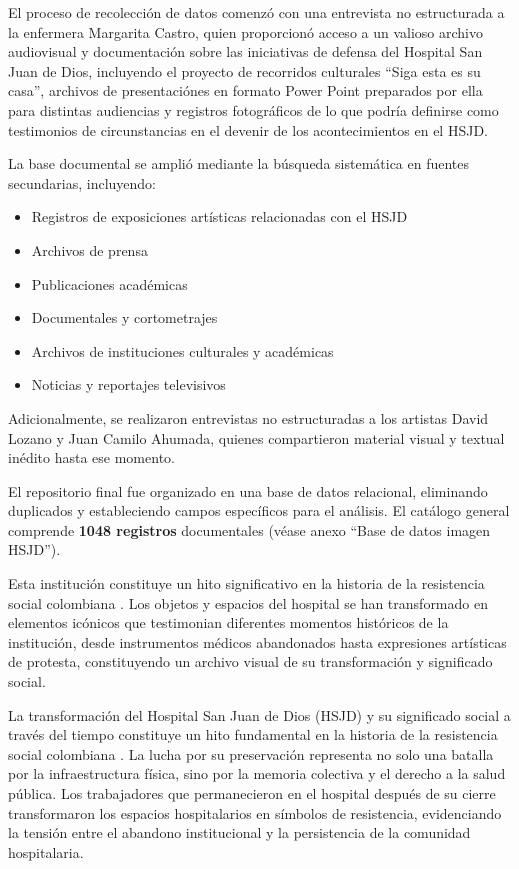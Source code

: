 El proceso de recolección de datos comenzó con una entrevista no estructurada a la enfermera Margarita Castro, quien proporcionó acceso a un valioso archivo audiovisual y documentación sobre las iniciativas de defensa del Hospital San Juan de Dios, incluyendo el proyecto de recorridos culturales ``Siga esta es su casa'', archivos de presentaciónes en formato Power Point preparados por ella para distintas audiencias y registros fotográficos de lo que podría definirse como testimonios de circunstancias en el devenir de los acontecimientos en el HSJD.
 

La base documental se amplió mediante la búsqueda sistemática en fuentes secundarias, incluyendo:
\begin{itemize}
\item Registros de exposiciones artísticas relacionadas con el HSJD
\item Archivos de prensa
\item Publicaciones académicas
\item Documentales y cortometrajes
\item Archivos de instituciones culturales y académicas
\item Noticias y reportajes televisivos
\end{itemize}

Adicionalmente, se realizaron entrevistas no estructuradas a los artistas David Lozano y Juan Camilo Ahumada, quienes compartieron material visual y textual inédito hasta ese momento.

El repositorio final fue organizado en una base de datos relacional, eliminando duplicados y estableciendo campos específicos para el análisis. El catálogo general comprende \textbf{1048 registros} documentales (véase anexo ``Base de datos imagen HSJD'').

Esta institución constituye un hito significativo en la historia de la resistencia social colombiana \parencite{Gongora2013}. Los objetos y espacios del hospital se han transformado en elementos icónicos que testimonian diferentes momentos históricos de la institución, desde instrumentos médicos abandonados hasta expresiones artísticas de protesta, constituyendo un archivo visual de su transformación y significado social.


La transformación del Hospital San Juan de Dios (HSJD) y su significado social a través del tiempo constituye un hito fundamental en la historia de la resistencia social colombiana \parencite{Gongora2013}. La lucha por su preservación representa no solo una batalla por la infraestructura física, sino por la memoria colectiva y el derecho a la salud pública. Los trabajadores que permanecieron en el hospital después de su cierre transformaron los espacios hospitalarios en símbolos de resistencia, evidenciando la tensión entre el abandono institucional y la persistencia de la comunidad hospitalaria.

